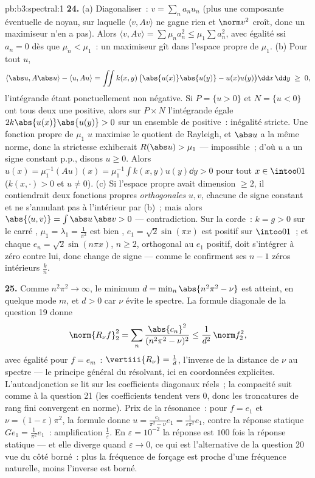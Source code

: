 \begin{solution}{pb:b3:spectral:1}
\textbf{24.} (a) Diagonaliser~: $v = \sum_na_nu_n$ (plus une
composante éventuelle de noyau, sur laquelle $\langle v,
Av\rangle$ ne gagne rien et $\norm v^2$ croît, donc un
maximiseur n'en a pas). Alors $\langle v, Av\rangle =
\sum\mu_na_n^2 \leq \mu_1\sum a_n^2$, avec égalité ssi $a_n
= 0$ dès que $\mu_n < \mu_1$~: un maximiseur gît dans
l'espace propre de $\mu_1$. (b) Pour tout $u$,
\[
\langle\abs u, A\abs u\rangle - \langle u, Au\rangle
= \iint k(x,y)\,\bigl(\abs{u(x)}\abs{u(y)} -
u(x)u(y)\bigr)\dd x\,\dd y \;\geq\; 0,
\]
l'intégrande étant ponctuellement non négative. Si $P = \{u
> 0\}$ et $N = \{u < 0\}$ ont tous deux une 
positive, alors sur $P\times N$ l'intégrande égale
$2k\abs{u(x)}\abs{u(y)} > 0$ sur un ensemble de 
positive~: inégalité stricte. Une fonction propre de
$\mu_1$ $u$ maximise le quotient de Rayleigh, et $\abs u$ a
la même norme, donc la strictesse exhiberait $R(\abs u) >
\mu_1$ --- impossible~; d'où $u$ a un signe constant p.p.,
disons $u \geq 0$. Alors $u(x) = \mu_1^{-1}(Au)(x) =
\mu_1^{-1}\int k(x,y)u(y)\dd y > 0$ pour tout $x \in
\intoo01$ ($k(x,\cdot) > 0$ et $u \neq 0$). (c) Si l'espace
propre avait dimension $\geq 2$, il contiendrait deux
fonctions propres \emph{orthogonales} $u, v$, chacune de
signe constant et ne s'annulant pas à l'intérieur par (b)~;
mais alors $\abs{\langle u, v\rangle} = \int\abs u\,\abs v
> 0$ --- contradiction. Sur la corde~: $k = g > 0$ sur le
carré , $\mu_1 = \lambda_1 = \frac1{\pi^2}$ est bien
, $e_1 = \sqrt2\sin(\pi x)$ est positif sur
$\intoo01$~; et chaque $e_n = \sqrt2\sin(n\pi x)$, $n \geq
2$, orthogonal au $e_1$ positif, doit s'intégrer à zéro
contre lui, donc change de signe --- comme le confirment
ses $n - 1$ zéros intérieurs $\frac kn$.

\textbf{25.} Comme $n^2\pi^2 \to \infty$, le minimum $d =
\min_n\abs{n^2\pi^2 - \nu}$ est atteint, en quelque mode
$m$, et $d > 0$ car $\nu$ évite le spectre. La formule
diagonale de la question 19 donne
\[
\norm{R_\nu f}_2^2 =
\sum_n\frac{\abs{c_n}^2}{(n^2\pi^2 - \nu)^2}
\leq \frac1{d^2}\,\norm f_2^2,
\]
avec égalité pour $f = e_m$~: $\vertiii{R_\nu} = \frac1d$,
l'inverse de la distance de $\nu$ au spectre --- le
principe général du résolvant, ici en coordonnées
explicites. L'autoadjonction se lit sur les coefficients
diagonaux réels~; la compacité suit comme à la question 21
(les coefficients tendent vers $0$, donc les troncatures de
rang fini convergent en norme). Prix de la résonance~: pour
$f = e_1$ et $\nu = (1-\varepsilon)\pi^2$, la formule donne
$u = \frac{c_1}{\pi^2 - \nu}e_1 =
\frac1{\varepsilon\pi^2}e_1$, contre la réponse statique
$Ge_1 = \frac1{\pi^2}e_1$~: amplification
$\frac1\varepsilon$. En $\varepsilon = 10^{-2}$ la réponse
est $100$ fois la réponse statique --- et elle diverge quand
$\varepsilon \to 0$, ce qui est l'alternative de la question
20 vue du côté borné~: plus la fréquence de forçage est
proche d'une fréquence naturelle, moins l'inverse est
borné.
\end{solution}
